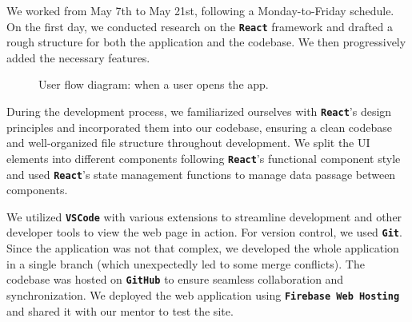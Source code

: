 \documentclass[12pt, a4paper]{article}
\newcommand{\ttbold}[1]{\textbf{\texttt{#1}}}
\begin{document}
\vspace*{.5cm}
\begin{figure}[H]
	{%
		\setlength{\fboxsep}{0pt}%
		\setlength{\fboxrule}{.5pt}%
	}%
	\hfill
	{%
		\setlength{\fboxsep}{0pt}%
		\setlength{\fboxrule}{.5pt}%
	}%
\end{figure}

\pagebreak

We worked from May 7th to May 21st, following a Monday-to-Friday schedule.
On the first day, we conducted research on the \ttbold{React} framework and drafted a rough structure for both the application and the codebase.
We then progressively added the necessary features.
\begin{figure}[H]
	\centering
	
	\caption{User flow diagram: when a user opens the app.}
\end{figure}

During the development process, we familiarized ourselves with \ttbold{React}'s design principles and incorporated them into our codebase, ensuring a clean codebase and well-organized file structure throughout development.
We split the UI elements into different components following \ttbold{React}'s functional component style and used \ttbold{React}'s state management functions to manage data passage between components.

We utilized \ttbold{VSCode} with various extensions to streamline development and other developer tools to view the web page in action.
For version control, we used \ttbold{Git}.
Since the application was not that complex, we developed the whole application in a single branch (which unexpectedly led to some merge conflicts).
The codebase was hosted on \ttbold{GitHub} to ensure seamless collaboration and synchronization.
We deployed the web application using \ttbold{Firebase Web Hosting} and shared it with our mentor to test the site.
\end{document}
